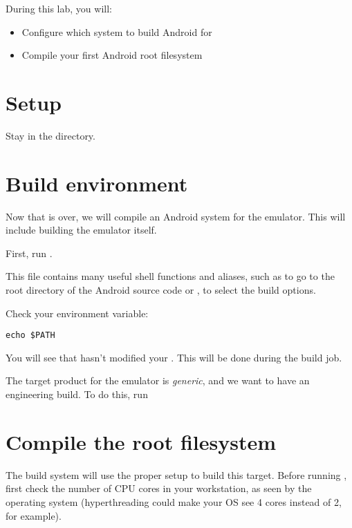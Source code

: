 
During this lab, you will:
\begin{itemize}
  \item Configure which system to build Android for
  \item Compile your first Android root filesystem
\end{itemize}

\section{Setup}

Stay in the  directory.

\section{Build environment}

Now that  is over, we will compile an Android system
for the emulator. This will include building the emulator itself.

First, run .

This file contains many useful shell functions and aliases, such as
 to go to the root directory of the Android source code or
, to select the build options.

Check your  environment variable:

\begin{verbatim}
echo $PATH
\end{verbatim}

You will see that  hasn't modified your
.  This will be done during the build job.

The target product for the emulator is {\it generic}, and we want to
have an engineering build. To do this, run 

\section{Compile the root filesystem}

The build system will use the proper setup to build this
target. Before running , first check the number of CPU
cores in your workstation, as seen by the operating system
(hyperthreading could make your OS see 4 cores instead of 2, for
example).

